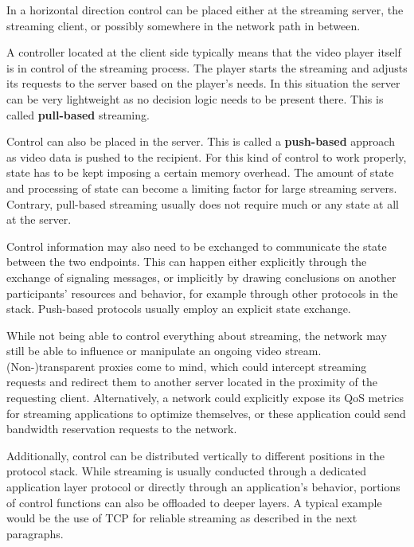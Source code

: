 In a horizontal direction control can be placed either at the streaming server, the streaming client, or possibly somewhere in the network path in between.

A controller located at the client side typically means that the video player itself is in control of the streaming process. The player starts the streaming and adjusts its requests to the server based on the player's needs. In this situation the server can be very lightweight as no decision logic needs to be present there. This is called \textbf{pull-based} streaming.

Control can also be placed in the server. This is called a \textbf{push-based} approach as video data is pushed to the recipient. For this kind of control to work properly, state has to be kept imposing a certain memory overhead. The amount of state and processing of state can become a limiting factor for large streaming servers. 
Contrary, pull-based streaming usually does not require much or any state at all at the server. %

Control information may also need to be exchanged to communicate the state between the two endpoints. This can happen either explicitly through the exchange of signaling messages, or implicitly by drawing conclusions on another participants' resources and behavior, for example through other protocols in the stack. Push-based protocols usually employ an explicit state exchange.

While not being able to control everything about streaming, the network may still be able to influence or manipulate an ongoing video stream. (Non-)transparent proxies come to mind, which could intercept streaming requests and redirect them to another server located in the proximity of the requesting client. Alternatively, a network could explicitly expose its \gls{QoS} metrics for streaming applications to optimize themselves, or these application could send bandwidth reservation requests to the network.

Additionally, control can be distributed vertically to different positions in the protocol stack. While streaming is usually conducted through a dedicated application layer protocol or directly through an application's behavior, portions of control functions can also be offloaded to deeper layers. A typical example would be the use of \gls{TCP} for reliable streaming as described in the next paragraphs.


